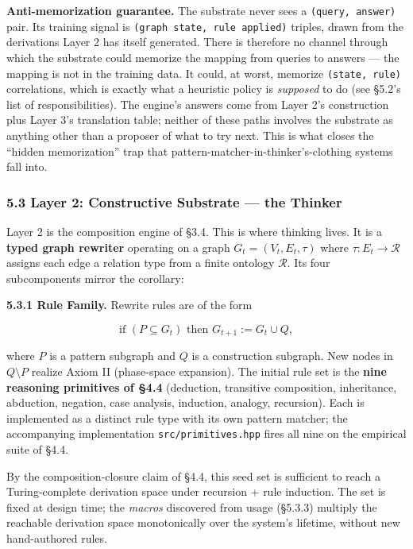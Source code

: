 \documentclass[
  11pt,
  a4paper,
]{article}
\begin{document}
\textbf{Anti-memorization guarantee.} The substrate never sees a
\texttt{(query,\ answer)} pair. Its training signal is
\texttt{(graph\ state,\ rule\ applied)} triples, drawn from the
derivations Layer 2 has itself generated. There is therefore no channel
through which the substrate could memorize the mapping from queries to
answers --- the mapping is not in the training data. It could, at worst,
memorize \texttt{(state,\ rule)} correlations, which is exactly what a
heuristic policy is \emph{supposed} to do (see §5.2's list of
responsibilities). The engine's answers come from Layer 2's construction
plus Layer 3's translation table; neither of these paths involves the
substrate as anything other than a proposer of what to try next. This is
what closes the ``hidden memorization'' trap that
pattern-matcher-in-thinker's-clothing systems fall into.

\subsubsection{5.3 Layer 2: Constructive Substrate --- the
Thinker}\label{layer-2-constructive-substrate-the-thinker}

Layer 2 is the composition engine of §3.4. This is where thinking lives.
It is a \textbf{typed graph rewriter} operating on a graph
\(G_t = (V_t, E_t, \tau)\) where \(\tau: E_t \to \mathcal{R}\) assigns
each edge a relation type from a finite ontology \(\mathcal{R}\). Its
four subcomponents mirror the corollary:

\textbf{5.3.1 Rule Family.} Rewrite rules are of the form

\[
\text{if } (P \subseteq G_t) \text{ then } G_{t+1} := G_t \cup Q,
\]

where \(P\) is a pattern subgraph and \(Q\) is a construction subgraph.
New nodes in \(Q \setminus P\) realize Axiom II (phase-space expansion).
The initial rule set is the \textbf{nine reasoning primitives of §4.4}
(deduction, transitive composition, inheritance, abduction, negation,
case analysis, induction, analogy, recursion). Each is implemented as a
distinct rule type with its own pattern matcher; the accompanying
implementation \texttt{src/primitives.hpp} fires all nine on the
empirical suite of §4.4.

By the composition-closure claim of §4.4, this seed set is sufficient to
reach a Turing-complete derivation space under recursion + rule
induction. The set is fixed at design time; the \emph{macros} discovered
from usage (§5.3.3) multiply the reachable derivation space
monotonically over the system's lifetime, without new hand-authored
rules.
\end{document}
